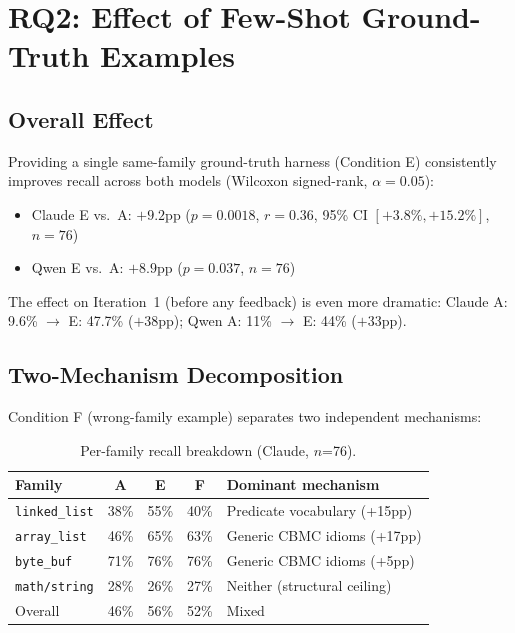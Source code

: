 \documentclass[review]{elsarticle}
\begin{document}
\section{RQ2: Effect of Few-Shot Ground-Truth Examples}
\label{sec:rq2}

\subsection{Overall Effect}

Providing a single same-family ground-truth harness (Condition E) consistently
improves recall across both models (Wilcoxon signed-rank, $\alpha = 0.05$):

\begin{itemize}
  \item Claude E vs.\ A: $+9.2$pp ($p = 0.0018$, $r = 0.36$,
        95\% CI $[+3.8\%, +15.2\%]$, $n = 76$)
  \item Qwen E vs.\ A: $+8.9$pp ($p = 0.037$, $n = 76$)
\end{itemize}

\noindent The effect on Iteration~1 (before any feedback) is even more dramatic:
Claude A: 9.6\% $\to$ E: 47.7\% ($+38$pp); Qwen A: 11\% $\to$ E: 44\% ($+33$pp).

\subsection{Two-Mechanism Decomposition}

Condition F (wrong-family example) separates two independent mechanisms:

\begin{table}[h]
\centering
\caption{Per-family recall breakdown (Claude, $n$=76).}
\label{tab:mechanisms}
\begin{tabular}{lcccl}
\toprule
\textbf{Family} & \textbf{A} & \textbf{E} & \textbf{F} & \textbf{Dominant mechanism} \\
\midrule
\texttt{linked\_list} & 38\% & 55\% & 40\% & Predicate vocabulary (+15pp) \\
\texttt{array\_list}  & 46\% & 65\% & 63\% & Generic CBMC idioms (+17pp) \\
\texttt{byte\_buf}    & 71\% & 76\% & 76\% & Generic CBMC idioms (+5pp) \\
\texttt{math/string}  & 28\% & 26\% & 27\% & Neither (structural ceiling) \\
\midrule
Overall & 46\% & 56\% & 52\% & Mixed \\
\bottomrule
\end{tabular}
\end{table}
\end{document}

